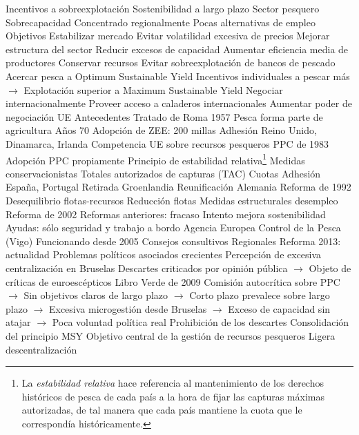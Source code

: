 \documentclass{nuevotema}
\begin{document}
\begin{esquemal}
				\4 Incentivos a sobreexplotación
				\4 Sostenibilidad a largo plazo
			\3 Sector pesquero
				\4 Sobrecapacidad
				\4 Concentrado regionalmente
				\4 Pocas alternativas de empleo
		\2 Objetivos
			\3 Estabilizar mercado
				\4 Evitar volatilidad excesiva de precios
			\3 Mejorar estructura del sector
				\4 Reducir excesos de capacidad
				\4 Aumentar eficiencia media de productores
			\3 Conservar recursos
				\4 Evitar sobreexplotación de bancos de pescado
				\4 Acercar pesca a Optimum Sustainable Yield
				\4 Incentivos individuales a pescar más
				\4[] $\to$ Explotación superior a Maximum Sustainable Yield
			\3 Negociar internacionalmente
				\4 Proveer acceso a caladeros internacionales
				\4 Aumentar poder de negociación UE
		\2 Antecedentes
			\3 Tratado de Roma 1957
				\4 Pesca forma parte de agricultura
			\3 Años 70
				\4 Adopción de ZEE: 200 millas
				\4 Adhesión Reino Unido, Dinamarca, Irlanda
				\4 Competencia UE sobre recursos pesqueros
			\3 PPC de 1983
				\4 Adopción PPC propiamente
				\4 Principio de estabilidad relativa\footnote{La \textit{estabilidad relativa} hace referencia al mantenimiento de los derechos históricos de pesca de cada país a la hora de fijar las capturas máximas autorizadas, de tal manera que cada país mantiene la cuota que le correspondía históricamente.}
				\4 Medidas conservacionistas
				\4 Totales autorizados de capturas (TAC)
				\4 Cuotas
				\4 Adhesión España, Portugal
				\4 Retirada Groenlandia
				\4 Reunificación Alemania
			\3 Reforma de 1992
				\4 Desequilibrio flotas-recursos
				\4 Reducción flotas
				\4 Medidas estructurales desempleo
			\3 Reforma de 2002
				\4 Reformas anteriores: fracaso
				\4 Intento mejora sostenibilidad
				\4 Ayudas: sólo seguridad y trabajo a bordo
				\4 Agencia Europea Control de la Pesca (Vigo)
				\4[] Funcionando desde 2005
				\4 Consejos consultivos Regionales
			\3 Reforma 2013: actualidad
				\4 Problemas políticos asociados crecientes
				\4[] Percepción de excesiva centralización en Bruselas
				\4[] Descartes criticados por opinión pública
				\4[] $\to$ Objeto de críticas de euroescépticos
				\4 Libro Verde de 2009
				\4[] Comisión autocrítica sobre PPC
				\4[] $\to$ Sin objetivos claros de largo plazo
				\4[] $\to$ Corto plazo prevalece sobre largo plazo
				\4[] $\to$ Excesiva microgestión desde Bruselas
				\4[] $\to$ Exceso de capacidad sin atajar
				\4[] $\to$ Poca voluntad política real
				\4 Prohibición de los descartes
				\4 Consolidación del principio MSY
				\4[] Objetivo central de la gestión de recursos pesqueros
				\4 Ligera descentralización

\end{esquemal}
\end{document}
